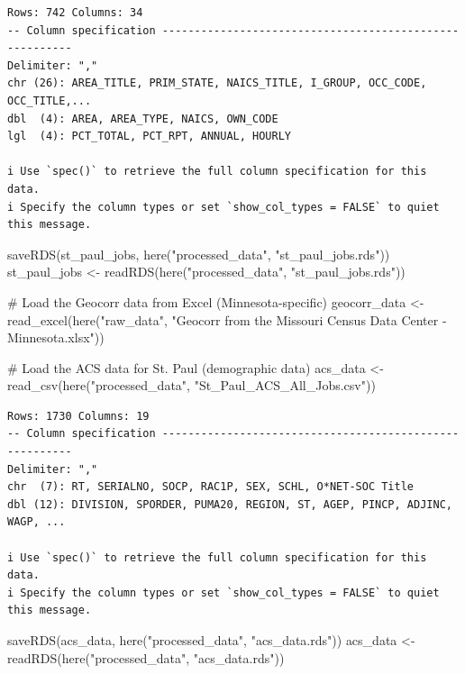 \documentclass[
  letterpaper,
  DIV=11,
  numbers=noendperiod]{scrartcl}
\newenvironment{Shaded}{\begin{snugshade}}{\end{snugshade}}
\newcommand{\CommentTok}[1]{\textcolor[rgb]{0.37,0.37,0.37}{#1}}
\newcommand{\FunctionTok}[1]{\textcolor[rgb]{0.28,0.35,0.67}{#1}}
\newcommand{\NormalTok}[1]{\textcolor[rgb]{0.00,0.23,0.31}{#1}}
\newcommand{\OtherTok}[1]{\textcolor[rgb]{0.00,0.23,0.31}{#1}}
\newcommand{\StringTok}[1]{\textcolor[rgb]{0.13,0.47,0.30}{#1}}
\begin{document}
\begin{verbatim}
Rows: 742 Columns: 34
-- Column specification --------------------------------------------------------
Delimiter: ","
chr (26): AREA_TITLE, PRIM_STATE, NAICS_TITLE, I_GROUP, OCC_CODE, OCC_TITLE,...
dbl  (4): AREA, AREA_TYPE, NAICS, OWN_CODE
lgl  (4): PCT_TOTAL, PCT_RPT, ANNUAL, HOURLY

i Use `spec()` to retrieve the full column specification for this data.
i Specify the column types or set `show_col_types = FALSE` to quiet this message.
\end{verbatim}

\begin{Shaded}
\begin{Highlighting}[]
\FunctionTok{saveRDS}\NormalTok{(st\_paul\_jobs, }\FunctionTok{here}\NormalTok{(}\StringTok{"processed\_data"}\NormalTok{, }\StringTok{"st\_paul\_jobs.rds"}\NormalTok{))}
\NormalTok{st\_paul\_jobs }\OtherTok{\textless{}{-}} \FunctionTok{readRDS}\NormalTok{(}\FunctionTok{here}\NormalTok{(}\StringTok{"processed\_data"}\NormalTok{, }\StringTok{"st\_paul\_jobs.rds"}\NormalTok{))}

\CommentTok{\# Load the Geocorr data from Excel (Minnesota{-}specific)}
\NormalTok{geocorr\_data }\OtherTok{\textless{}{-}} \FunctionTok{read\_excel}\NormalTok{(}\FunctionTok{here}\NormalTok{(}\StringTok{"raw\_data"}\NormalTok{, }\StringTok{"Geocorr from the Missouri Census Data Center {-} Minnesota.xlsx"}\NormalTok{))}

\CommentTok{\# Load the ACS data for St. Paul (demographic data)}
\NormalTok{acs\_data }\OtherTok{\textless{}{-}} \FunctionTok{read\_csv}\NormalTok{(}\FunctionTok{here}\NormalTok{(}\StringTok{"processed\_data"}\NormalTok{, }\StringTok{"St\_Paul\_ACS\_All\_Jobs.csv"}\NormalTok{))}
\end{Highlighting}
\end{Shaded}

\begin{verbatim}
Rows: 1730 Columns: 19
-- Column specification --------------------------------------------------------
Delimiter: ","
chr  (7): RT, SERIALNO, SOCP, RAC1P, SEX, SCHL, O*NET-SOC Title
dbl (12): DIVISION, SPORDER, PUMA20, REGION, ST, AGEP, PINCP, ADJINC, WAGP, ...

i Use `spec()` to retrieve the full column specification for this data.
i Specify the column types or set `show_col_types = FALSE` to quiet this message.
\end{verbatim}

\begin{Shaded}
\begin{Highlighting}[]
\FunctionTok{saveRDS}\NormalTok{(acs\_data, }\FunctionTok{here}\NormalTok{(}\StringTok{"processed\_data"}\NormalTok{, }\StringTok{"acs\_data.rds"}\NormalTok{))}
\NormalTok{acs\_data }\OtherTok{\textless{}{-}} \FunctionTok{readRDS}\NormalTok{(}\FunctionTok{here}\NormalTok{(}\StringTok{"processed\_data"}\NormalTok{, }\StringTok{"acs\_data.rds"}\NormalTok{))}
\end{Highlighting}
\end{Shaded}
\end{document}
